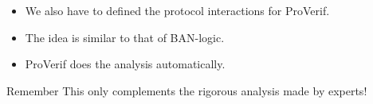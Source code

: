 \begin{frame}
  \begin{itemize}
    \item We also have to defined the protocol interactions for ProVerif.
    \item The idea is similar to that of BAN-logic.
    \item ProVerif does the analysis automatically.
  \end{itemize}
  
  \pause{}

  \begin{alertblock}{Remember}
    This only complements the rigorous analysis made by experts!
  \end{alertblock}
\end{frame}



\begin{frame}
	\small
  \printbibliography
\end{frame}

